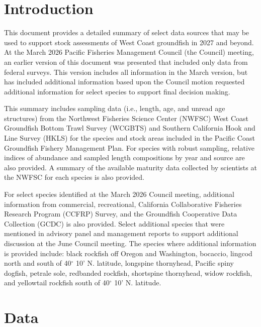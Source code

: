 \documentclass[
  english,
]{article}
\begin{document}
\setlength{\parskip}{5mm plus1mm minus1mm}
\setcounter{page}{1}
\setcounter{section}{0}
\renewcommand{\thefigure}{\arabic{figure}}
\renewcommand{\thetable}{\arabic{table}}
\setcounter{table}{0}
\setcounter{figure}{0}

\section{Introduction}\label{introduction}

This document provides a detailed summary of select data sources that
may be used to support stock assessments of West Coast groundfish in
2027 and beyond. At the March 2026 Pacific Fisheries Management Council
(the Council) meeting, an earlier version of this document was presented
that included only data from federal surveys. This version includes all
information in the March version, but has included additional
information based upon the Council motion requested additional
information for select species to support final decision making.

This summary includes sampling data (i.e., length, age, and unread age
structures) from the Northwest Fisheries Science Center (NWFSC) West
Coast Groundfish Bottom Trawl Survey (WCGBTS) and Southern California
Hook and Line Survey (HKLS) for the species and stock areas included in
the Pacific Coast Groundfish Fishery Management Plan. For species with
robust sampling, relative indices of abundance and sampled length
compositions by year and source are also provided. A summary of the
available maturity data collected by scientists at the NWFSC for each
species is also provided.

For select species identified at the March 2026 Council meeting,
additional information from commercial, recreational, California
Collaborative Fisheries Research Program (CCFRP) Survey, and the
Groundfish Cooperative Data Collection (GCDC) is also provided. Select
additional species that were mentioned in advisory panel and management
reports to support additional discussion at the June Council meeting.
The species where additional information is provided include: black
rockfish off Oregon and Washington, bocaccio, lingcod north and south of
40\(^\circ\) 10' N. latitude, longspine thornyhead, Pacific spiny
dogfish, petrale sole, redbanded rockfish, shortspine thornyhead, widow
rockfish, and yellowtail rockfish south of 40\(^\circ\) 10' N. latitude.

\section{Data}\label{data}
\end{document}
